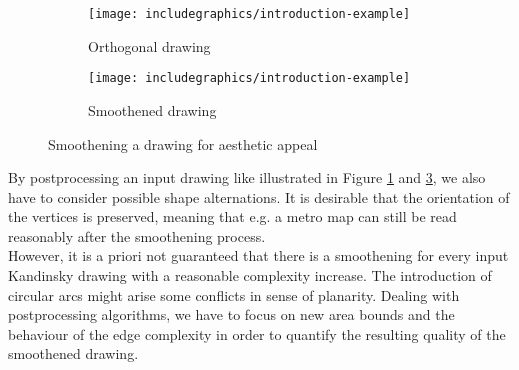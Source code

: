 \begin{figure}[H]
	\centering
	\begin{subfigure}{0.45\textwidth}
		\centering
		\texttt{[image: includegraphics/introduction-example]}
		\caption{Orthogonal drawing}\label{im:introduction_ex1}
	\end{subfigure}
	\begin{subfigure}{0.45\textwidth}
		\centering
		\texttt{[image: includegraphics/introduction-example]}
		\caption{Smoothened drawing}\label{im:introduction_ex2}
	\end{subfigure}
	\caption{Smoothening a drawing for aesthetic appeal}
\end{figure}
By postprocessing an input drawing like illustrated in Figure \ref{im:introduction_ex1} and \ref{im:introduction_ex2}, we also have to consider possible shape alternations. It is desirable that the orientation of the vertices is preserved, meaning that e.g. a metro map can still be read reasonably after the smoothening process\cite{metro1}.\\
However, it is a priori not guaranteed that there is a smoothening for every input Kandinsky drawing with a reasonable complexity increase. The introduction of circular arcs might arise some conflicts in sense of planarity. Dealing with postprocessing algorithms, we have to focus on new area bounds and the behaviour of the edge complexity in order to quantify the resulting quality of the smoothened drawing.